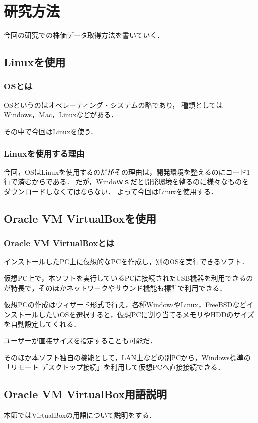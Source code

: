 \chapter{研究方法}

今回の研究での株価データ取得方法を書いていく．


\section{Linuxを使用}
\subsection{OSとは}
OSというのはオペレーティング・システムの略であり，
種類としてはWindows，Mac，Linuxなどがある．

その中で今回はLinuxを使う．

\subsection{Linuxを使用する理由}
今回，OSはLinuxを使用するのだがその理由は，開発環境を整えるのにコード1行で済むからである．
だが，Windoｗｓだと開発環境を整るのに様々なものをダウンロードしなくてはならない．
よって今回はLinuxを使用する．


\section{Oracle VM VirtualBoxを使用}
\subsection{Oracle VM VirtualBoxとは}
インストールしたPC上に仮想的なPCを作成し，別のOSを実行できるソフト．

仮想PC上で，本ソフトを実行しているPCに接続されたUSB機器を利用できるのが特長で，そのほかネットワークやサウンド機能も標準で利用できる．

仮想PCの作成はウィザード形式で行え，各種WindowsやLinux，FreeBSDなどインストールしたいOSを選択すると，仮想PCに割り当てるメモリやHDDのサイズを自動設定してくれる．

ユーザーが直接サイズを指定することも可能だ．

そのほか本ソフト独自の機能として，LAN上などの別PCから，Windows標準の「リモート デスクトップ接続」を利用して仮想PCへ直接接続できる\cite{oracle}．



\section{Oracle VM VirtualBox用語説明}
本節ではVirtualBoxの用語について説明をする．
